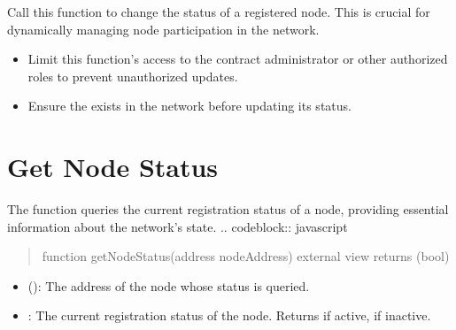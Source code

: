 \documentclass[a4paper,10pt,english]{sphinxmanual}
\begin{document}
\sphinxAtStartPar
{}

\sphinxAtStartPar
Call this function to change the status of a registered node. This is crucial for dynamically managing node participation in the network.

\sphinxAtStartPar
{}
\begin{itemize}
\item {} 
\sphinxAtStartPar
{} Limit this function’s access to the contract administrator or other authorized roles to prevent unauthorized updates.

\item {} 
\sphinxAtStartPar
{} Ensure the  exists in the network before updating its status.

\end{itemize}


\section{Get Node Status}
\label{\detokenize{docs_node_manager_contract:get-node-status}}
\sphinxAtStartPar
The  function queries the current registration status of a node, providing essential information about the network’s state.
.. code\sphinxhyphen{}block:: javascript
\begin{quote}

\sphinxAtStartPar
function getNodeStatus(address nodeAddress) external view returns (bool)
\end{quote}

\sphinxAtStartPar
{}
\begin{itemize}
\item {} 
\sphinxAtStartPar
{} ():
The address of the node whose status is queried.

\end{itemize}

\sphinxAtStartPar
{}
\begin{itemize}
\item {} 
\sphinxAtStartPar
{}:
The current registration status of the node. Returns  if active,  if inactive.

\end{itemize}
\end{document}
